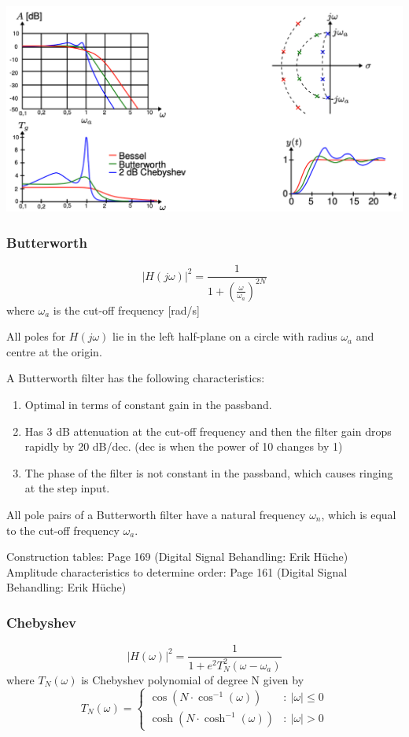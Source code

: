 \begin{center}
  \includegraphics[width=\textwidth]{Images/Filter-Transform.png} 
\end{center}

\subsubsection{Butterworth}
$$|H(j\omega)|^2=\frac{1}{1+(\frac{\omega}{\omega_{a}})^{2N}}$$
where $\omega_{a}$ is the cut-off frequency [rad/s]

All poles for $H(j\omega)$ lie in the left half-plane on a circle with radius $\omega_{a}$ and centre at the origin.

A Butterworth filter has the following characteristics:
\begin{enumerate}
  \item Optimal in terms of constant gain in the passband.
  \item Has 3 dB attenuation at the cut-off frequency and then the filter gain drops rapidly by 20 dB/dec. (dec is when the power of 10 changes by 1)
  \item The phase of the filter is not constant in the passband, which causes ringing at the step input.
\end{enumerate}
All pole pairs of a Butterworth filter have a natural frequency $\omega_{n}$, which is equal to the cut-off frequency $\omega_a$.

Construction tables: Page 169 (Digital Signal Behandling: Erik Hüche)\\
Amplitude characteristics to determine order: Page 161 (Digital Signal Behandling: Erik Hüche)


\subsubsection{Chebyshev}
$$|H(\omega)|^2=\frac{1}{1+e^{ 2 }T_{N}^2(\omega-\omega_{a})}$$
where $T_{N}(\omega)$ is Chebyshev polynomial of degree N given by
$$T_{N}(\omega)=\left\{ \begin{array}{cl}
\cos(N\cdot \cos^{-1}(\omega)) & : \ |\omega| \leq 0 \\
\cosh(N\cdot \cosh^{-1}(\omega)) & : \ |\omega| > 0
\end{array} \right.$$

